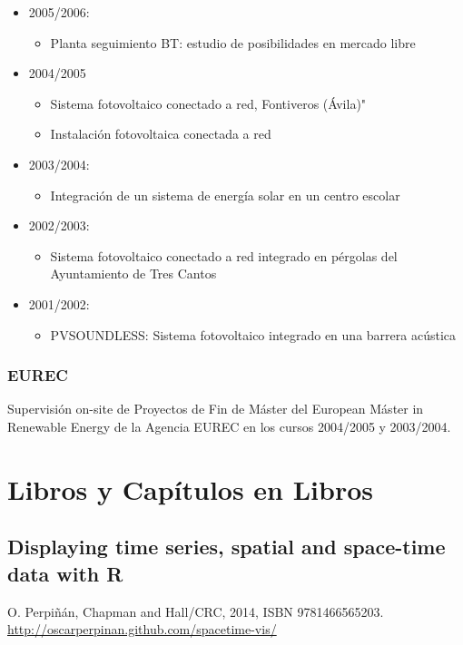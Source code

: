 \documentclass[article, a4paper]{memoir}
\begin{document}
\begin{itemize}
\begin{itemize}
\end{itemize}
\item 2005/2006:
\begin{itemize}
\item \guillemotleft{}Planta seguimiento BT: estudio de posibilidades en mercado libre\guillemotright{}
\end{itemize}
\item 2004/2005
\begin{itemize}
\item \guillemotleft{}Sistema fotovoltaico conectado a red, Fontiveros (Ávila)"
\item \guillemotleft{}Instalación fotovoltaica conectada a red\guillemotright{}
\end{itemize}
\item 2003/2004:
\begin{itemize}
\item \guillemotleft{}Integración de un sistema de energía solar en un centro escolar\guillemotright{}
\end{itemize}
\item 2002/2003:
\begin{itemize}
\item \guillemotleft{}Sistema fotovoltaico conectado a red integrado en pérgolas del Ayuntamiento de Tres Cantos\guillemotright{}
\end{itemize}
\item 2001/2002:
\begin{itemize}
\item \guillemotleft{}PVSOUNDLESS: Sistema fotovoltaico integrado en una barrera acústica\guillemotright{}
\end{itemize}
\end{itemize}

\subsubsection{EUREC}
\label{sec-5-3-3}
Supervisión on-site de Proyectos de Fin de Máster del European Máster in Renewable Energy de la Agencia EUREC en los cursos 2004/2005 y 2003/2004.

\section{Libros y Capítulos en Libros}
\label{sec-6}

\subsection{Displaying time series, spatial and space-time data with R}
\label{sec-6-1}
O. Perpiñán, Chapman and Hall/CRC, 2014, ISBN 9781466565203. \url{http://oscarperpinan.github.com/spacetime-vis/}
\end{document}
